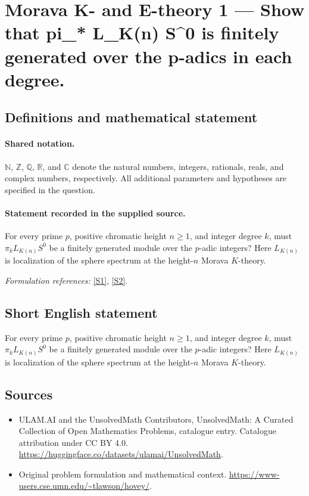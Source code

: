 \documentclass[11pt]{article}
\newcommand{\sref}[2]{\hyperlink{source:#1:#2}{[S#2]}}
\begin{document}
\section{Morava K- and E-theory 1 — Show that pi\_* L\_K(n) S\textasciicircum{}0 is finitely generated over the p-adics in each degree.}\label{statement}

\subsection{Definitions and mathematical statement}

\paragraph{Shared notation.}$\mathbb N$, $\mathbb Z$, $\mathbb Q$, $\mathbb R$, and $\mathbb C$ denote the natural numbers, integers, rationals, reals, and complex numbers, respectively. All additional parameters and hypotheses are specified in the question.


\paragraph{Statement recorded in the supplied source.}
For every prime $p$, positive chromatic height $n\ge1$, and integer degree $k$, must $\pi_kL_{K(n)}S^0$ be a finitely generated module over the $p$-adic integers? Here $L_{K(n)}$ is localization of the sphere spectrum at the height-$n$ Morava $K$-theory.
\par\smallskip\textit{Formulation references:} \sref{statement}{1}, \sref{statement}{2}.
\subsection{Short English statement}
For every prime $p$, positive chromatic height $n\ge1$, and integer degree $k$, must $\pi_kL_{K(n)}S^0$ be a finitely generated module over the $p$-adic integers? Here $L_{K(n)}$ is localization of the sphere spectrum at the height-$n$ Morava $K$-theory.
\subsection{Sources}
\begin{itemize}
\item[\hypertarget{source:statement:1}{S1}] ULAM.AI and the UnsolvedMath Contributors, UnsolvedMath: A Curated Collection of Open Mathematics Problems, catalogue entry. Catalogue attribution under CC BY 4.0.
\url{https://huggingface.co/datasets/ulamai/UnsolvedMath}.
\item[\hypertarget{source:statement:2}{S2}] Original problem formulation and mathematical context.
\url{https://www-users.cse.umn.edu/~tlawson/hovey/}.
\end{itemize}
\label{end:statement}
\end{document}
